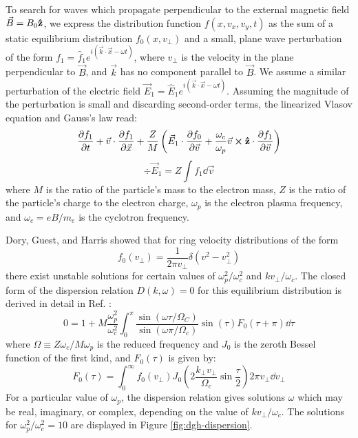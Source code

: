 \documentclass[%
 reprint,
 amsmath,amssymb,
 aps,
]{revtex4-2}
\begin{document}
To search for waves which propagate perpendicular to the external magnetic field $\vec B = B_0 \vu z$, we express the distribution function $f(x, v_x, v_y, t)$ as the sum of a static equilibrium distribution $f_0(x, v_\perp)$ and a small, plane wave perturbation of the form $f_1 = \hat{f}_1 e^{i(\vec k \cdot \vec x - \omega t)}$, where $v_\perp$ is the velocity in the plane perpendicular to $\vec B$, and $\vec k$ has no component parallel to $\vec B$. We assume a similar perturbation of the electric field $\vec E_1 = \hat E_1 e^{i ( \vec k \cdot \vec x - \omega t)}$. Assuming the magnitude of the perturbation is small and discarding second-order terms, the linearized Vlasov equation and Gauss's law read:
\begin{equation}
\pdv{f_1}{t} + \vec v \cdot \pdv{f_1}{\vec x} + \frac{Z}{M} \left( \vec E_1 \cdot \pdv{f_0}{\vec v} + \frac{\omega_c}{\omega_p} \vec v \cross \vu z \cdot \pdv{f_1}{\vec v} \right)
\end{equation}
\begin{equation}
\div \vec E_1 = Z \int f_1 \dd \vec v
\end{equation}
where $M$ is the ratio of the particle's mass to the electron mass, $Z$ is the ratio of the particle's charge to the electron charge, $\omega_p$ is the electron plasma frequency, and $\omega_c = e B / m_e$ is the cyclotron frequency.

Dory, Guest, and Harris \cite{PhysRevLett.14.131} showed that for ring velocity distributions of the form
\begin{equation}
f_0(v _\perp) = \frac{1}{2 \pi v_\perp} \delta(v ^2 - v_\perp ^2) \label{eqn:ringdist}
\end{equation}
there exist unstable solutions for certain values of $\omega_p ^2 / \omega_c ^2$ and $k v_\perp / \omega_c$. The closed form of the dispersion relation $D(k, \omega) = 0$ for this equilibrium distribution is derived in detail in Ref. \cite{VogmanG.V2014Diaa}:
\begin{equation}
0 = 1 + M \frac{\omega_p ^2}{\omega_c ^2} \int _0 ^\pi \frac{\sin (\omega \tau / \Omega_C)}{\sin ( \omega \pi / \Omega_c)} \sin(\tau) F_0(\tau + \pi) \dd \tau \label{eqn-dispersion}
\end{equation}
where $\Omega \equiv Z \omega_c / M \omega_p$ is the reduced frequency and $J_0$ is the zeroth Bessel function of the first kind, and $F_0(\tau)$ is given by:
\begin{equation}
F_0(\tau) = \int _0 ^\infty f_0 ( v_\perp) J_0 \left( 2 \frac{k_\perp v_\perp}{\Omega_c} \sin \frac{\tau}{2} \right) 2 \pi v_\perp \dd v_\perp 
\end{equation}
For a particular value of $\omega_p$, the dispersion relation gives solutions $\omega$ which may be real, imaginary, or complex, depending on the value of $k v_\perp / \omega_c$. The solutions for $\omega_p ^2 / \omega_c ^2 = 10$ are displayed in Figure \ref{fig:dgh-dispersion}.
\end{document}
